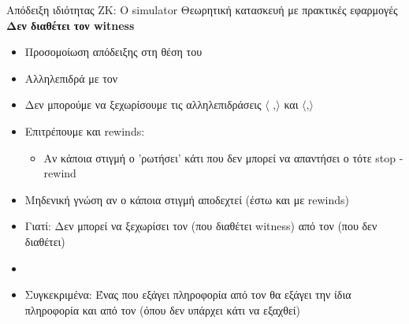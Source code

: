 \documentclass[handout]{beamer}
\begin{document}
\begin{frame}{Απόδειξη ιδιότητας ΖΚ: Ο simulator}
{Θεωρητική κατασκευή με πρακτικές εφαρμογές}
\textbf{Δεν διαθέτει τον witness}
\pause
\begin{small}
\begin{itemize}
\setlength\itemsep{0.01em}
\item Προσομοίωση απόδειξης στη θέση του \prv
\item Αλληλεπιδρά με τον \ver
\pause
\item Δεν μπορούμε να ξεχωρίσουμε τις αλληλεπιδράσεις $\langle$ \siml,\ver $\rangle$ και $\langle$\prv,\ver$\rangle$
\pause
\item Επιτρέπουμε και rewinds:
\pause
\begin{itemize}
\item Αν κάποια στιγμή ο \ver 'ρωτήσει' κάτι που δεν μπορεί να απαντήσει ο \siml τότε stop - rewind
\end{itemize}
\pause
\item Μηδενική γνώση αν ο \ver κάποια στιγμή αποδεχτεί (έστω και με rewinds)
\pause
\item Γιατί: \pause
Δεν μπορεί να ξεχωρίσει τον \prv (που διαθέτει witness) από τον \siml (που δεν διαθέτει) 
\pause
\item {}
\pause
\item Συγκεκριμένα: Ένας \ver που εξάγει πληροφορία από τον \prv θα εξάγει την ίδια πληροφορία και από τον \siml (όπου δεν υπάρχει κάτι να εξαχθεί)

\end{itemize}
\end{small}
\end{frame}
\end{document}
